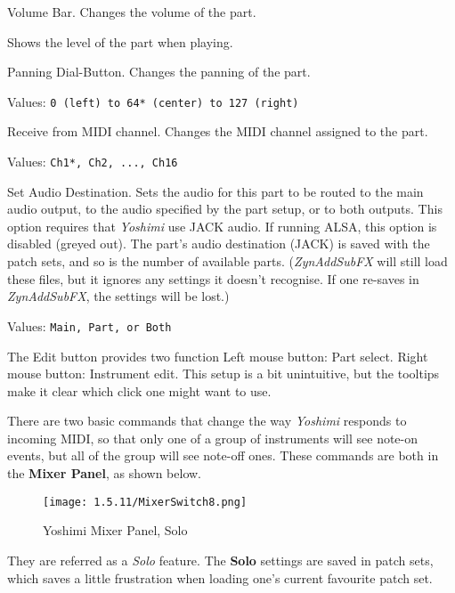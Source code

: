    Volume Bar.
   Changes the volume of the part.

   Shows the level of the part when playing.

   Panning Dial-Button.
   Changes the panning of the part.

   Values: \texttt{0 (left) to 64* (center) to 127 (right)}

   Receive from MIDI channel.
   Changes the MIDI channel assigned to the part.

   Values: \texttt{Ch1*, Ch2, ..., Ch16}

   Set Audio Destination.
   Sets the audio for this part to be routed to the main audio output, to
   the audio specified by the part setup, or to both outputs.
   This option requires that \textsl{Yoshimi} use JACK audio.  If running
   ALSA, this option is disabled (greyed out).
   The part's audio destination (JACK) is saved with the patch sets, and
   so is the number of available parts.  (\textsl{ZynAddSubFX} will still
   load these files, but it ignores any settings it doesn't recognise. If
   one re-saves in \textsl{ZynAddSubFX}, the settings will be lost.)

   Values: \texttt{Main, Part, or Both}

   The Edit button provides two function
   Left mouse button: Part select.
   Right mouse button: Instrument edit.
   This setup is a bit unintuitive, but the tooltips make it clear
   which click one might want to use.

   There are two basic commands that change the way
   \textsl{Yoshimi} responds to incoming MIDI,
   so that only one of a group of instruments will see note-on events, but all
   of the group will see note-off ones. These commands
   are both in the \textbf{Mixer Panel}, as shown below.
\begin{figure}[H]
   \centering
   \texttt{[image: 1.5.11/MixerSwitch8.png]}
   \caption[Yoshimi Mixer Panel]{Yoshimi Mixer Panel, Solo}
   \label{fig:yoshimi_part_panel_solo}
\end{figure}
   They are referred as a \textsl{Solo} feature.
   The \textbf{Solo} settings are saved in patch sets, which saves a
   little frustration when loading one's current favourite patch set.

